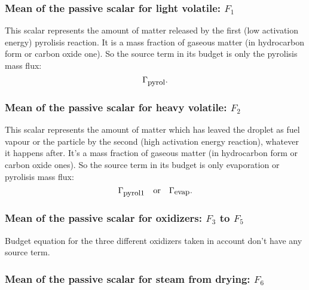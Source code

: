 \subsubsection{Mean of the passive scalar for light volatile: $F_{1}$}  

This scalar represents the amount of matter released by the first (low
activation energy) pyrolisis reaction. It is a mass fraction of gaseous matter
(in hydrocarbon form or carbon oxide one). So the source term in its budget is
only the pyrolisis mass flux:
\begin{equation}
    \Gamma _{\mbox{\small pyrol}}.
\end{equation}
\subsubsection{Mean of the passive scalar for heavy volatile: $F_{2}$}  

This scalar represents the amount of matter which has leaved the droplet as fuel
vapour or the particle by the second (high activation energy reaction), whatever
it happens after. It's a mass fraction of gaseous matter (in hydrocarbon form or
carbon oxide ones). So the source term in its budget is only evaporation or
pyrolisis mass flux:
\begin{equation}
    \Gamma_{\mbox{\small pyrol1}} \quad \text{or} \quad \Gamma_{\mbox{\small evap}}.
\end{equation}     

\subsubsection{Mean of the passive scalar for oxidizers: $F_{3}$ to $F_{5}$}  

Budget equation for the three different oxidizers taken in account don't have
any source term.
\subsubsection{Mean of the passive scalar for steam from drying: $F_{6}$}  
 
